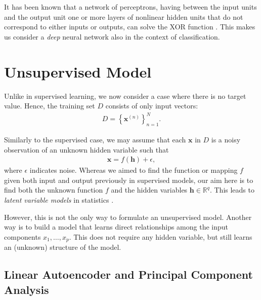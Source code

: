 \documentclass[dissertation,nocontribution,draft*]{aaltoseries}
\newcommand{\vect}[1]{\mathbf{#1}}
\newcommand{\vh}[0]{\vect{h}}
\newcommand{\vx}[0]{\vect{x}}
\newcommand{\RR}[0]{\mathbb{R}}
\begin{document}
It has been known that a network of perceptrons, having
between the input units and the output unit one or more
layers of nonlinear hidden units that do not correspond to
either inputs or outputs, can solve the XOR function
\citep[see, e.g.,][]{Touretzky1989}. This makes us consider
a \textit{deep} neural network also in the context of
classification.




\section{Unsupervised Model}
\label{sec:unsupervised_model}

Unlike in supervised learning, we now consider a case where
there is no target value. Hence, the training set $D$ consists of
only input vectors:
\begin{align}
    \label{eq:unsup_train}
D=\left\{ \vx^{(n)} \right\}_{n=1}^N.
\end{align}

Similarly to the supervised case, we may assume that each
$\vx$ in $D$ is a noisy observation of an unknown hidden
variable such that
\begin{align}
    \label{eq:lvm}
    \vx = f(\vh) + \epsilon,
\end{align}
where $\epsilon$ indicates noise. Whereas we aimed
to find the function or mapping $f$ given both input and
output previously in supervised models, our aim here is to
find both the unknown function $f$ and the hidden variables
$\vh \in \RR^q$. This leads to 
\textit{latent variable models} in statistics \citep[see,
e.g.,][]{Murphy2012}.

However, this is not the only way to formulate an
unsupervised model. Another way is to build a model that
learns direct relationships among the input components $x_1,
\dots, x_p$. This does not require any hidden variable, but
still learns an (unknown) structure of the model.


\subsection{Linear Autoencoder and Principal Component Analysis}
\label{sec:linear_autoencoder}
\end{document}
